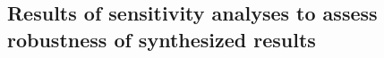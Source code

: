 \documentclass[
hf,
]{ceurart}
\begin{document}





\subsection{Results of sensitivity analyses to assess robustness of synthesized results}
\end{document}
